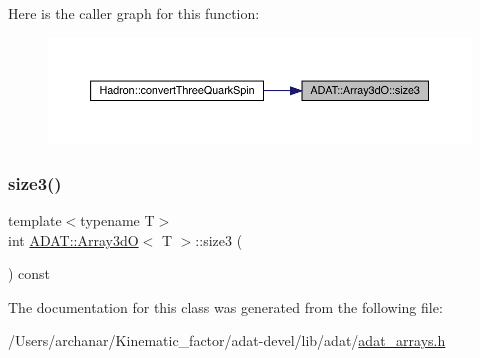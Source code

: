 Here is the caller graph for this function\+:
\nopagebreak
\begin{figure}[H]
\begin{center}
\leavevmode
\includegraphics[width=350pt]{dd/da8/classADAT_1_1Array3dO_acd5ccea08cb9cde541a396823af21161_icgraph}
\end{center}
\end{figure}
\mbox{\label{classADAT_1_1Array3dO_acd5ccea08cb9cde541a396823af21161}} 
\subsubsection{\texorpdfstring{size3()}{size3()}\hspace{0.1cm}{\footnotesize\ttfamily [3/3]}}
{\footnotesize\ttfamily template$<$typename T$>$ \\
int \mbox{\hyperlink{classADAT_1_1Array3dO}{A\+D\+A\+T\+::\+Array3dO}}$<$ T $>$\+::size3 (\begin{DoxyParamCaption}{ }\end{DoxyParamCaption}) const\hspace{0.3cm}{\ttfamily [inline]}}



The documentation for this class was generated from the following file\+:\begin{DoxyCompactItemize}
\item 
/\+Users/archanar/\+Kinematic\+\_\+factor/adat-\/devel/lib/adat/\mbox{\hyperlink{adat-devel_2lib_2adat_2adat__arrays_8h}{adat\+\_\+arrays.\+h}}\end{DoxyCompactItemize}
